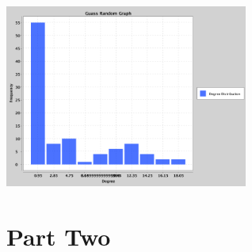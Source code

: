 \documentclass{article}
\begin{document}
\begin{center}
        \includegraphics[width=0.6\textwidth]{c5.png}
    \end{center}

\section{Part Two}
\end{document}
